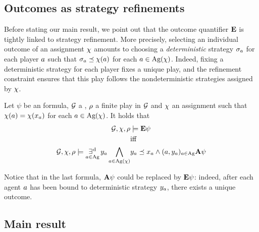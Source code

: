\subsection{Outcomes as strategy refinements}
\label{sec-link-E-ref}

Before stating our main result, we point out that the outcome
quantifier ${\bf E}$ is tightly linked to strategy refinement. More
precisely, selecting an individual outcome of an assignment
$\chi$ amounts to choosing a \emph{deterministic} strategy $\sigma_a$ for each
player $a$ such that $\sigma_a\preceq \chi(a)$ for each $a\in\textnormal{Ag}(\chi)$.
Indeed, fixing a deterministic strategy for each player fixes a unique
play, and the refinement constraint ensures that this play follows the
nondeterministic strategies assigned by $\chi$.

\begin{lemma}
  \label{lem-link-E-ref}
  Let $\psi$ be an \LTL formula, $\CGS$ a \CGS, $\rho$ a finite play
  in $\CGS$ and $\chi$ an assignment such that
  $\chi(a)=\chi(x_a)$ for each $a\in\textnormal{Ag}(\chi)$.  It holds
  that
  \begin{align*}
      \CGS,\assign,\fplay &\models\Eout\psi \\
      &\text{iff} \\
    \CGS,\assign,\fplay \models
      \existsd_{\ag\in\Agf} \varb_{\ag}
      \bigwedge_{\ag\in\Agf(\assign)}&\varb_\ag \refines \var_\ag
                          \wedge (\ag,\varb_\ag)_{\ag\in\Agf} \Aout\psi
  \end{align*}
\end{lemma}

Notice that in the last formula, ${\bf A}\psi$ could be replaced by
${\bf E}\psi$: indeed, after each agent $a$ has been bound to deterministic
strategy $y_a$,  there exists a unique outcome.

\subsection{Main result}
\label{sec-main-result}

